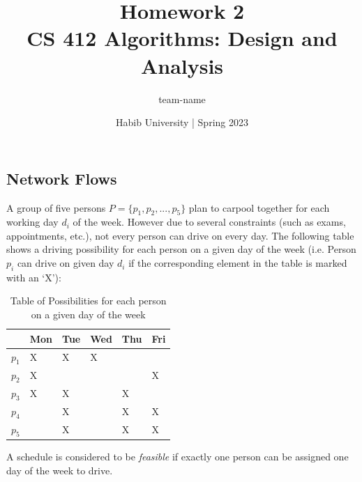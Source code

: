 \documentclass[addpoints,a4paper]{exam}
\title{Homework 2\\ CS 412 Algorithms: Design and Analysis}
\author{team-name}  %
\date{Habib University | Spring 2023}
\begin{document}
\maketitle

\begin{questions}


  \section*{Network Flows}
  \question A group of five persons $P = \{p_1, p_2, ..., p_5\}$ plan to carpool together for each working day $d_i$ of the week. However due to several constraints (such as exams, appointments, etc.), not every person can drive on every day. The following table shows a driving possibility for each person on a given day of the week (i.e. Person $p_i$ can drive on given day $d_i$ if the corresponding element in the table is marked with an `X'):

  \begin{table}[h]
    \centering
    \renewcommand{\arraystretch}{1.5}
    \begin{tabular}{llllll}
            & Mon & Tue & Wed & Thu & Fri \\ \hline
      $p_1$ & X   & X   & X   &     &     \\ \hline
      $p_2$ & X   &     &     &     & X   \\ \hline
      $p_3$ & X   & X   &     & X   &     \\ \hline
      $p_4$ &     & X   &     & X   & X   \\ \hline
      $p_5$ &     & X   &     & X   & X   \\ \hline
    \end{tabular}%
    \caption{Table of Possibilities for each person on a given day of the week} \label{key}
  \end{table}

  A schedule is considered to be \textit{feasible} if exactly one person can be assigned one day of the week to drive.
  \begin{solution}


\end{solution}
\end{questions}
\end{document}
